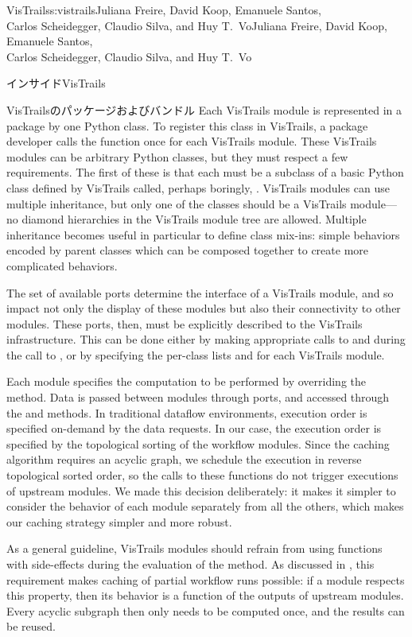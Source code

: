 \begin{aosachaptertoc}{VisTrails}{s:vistrails}{Juliana Freire, David Koop, Emanuele Santos, \\ Carlos Scheidegger, Claudio Silva, and Huy T.\ Vo}{Juliana Freire, David Koop, Emanuele Santos, \\ \hspace*{0.9cm} Carlos Scheidegger, Claudio Silva, and Huy T.\ Vo}
\begin{aosasect1}{インサイドVisTrails}
\begin{aosasect2}{VisTrailsのパッケージおよびバンドル}
Each VisTrails module is represented in a package by one Python
class. To register this class in VisTrails, a package developer calls
the  function once for each VisTrails module.  These
VisTrails modules can be arbitrary Python classes, but they must
respect a few requirements. The first of these is that each must be a
subclass of a basic Python class defined by VisTrails called, perhaps
boringly, .  VisTrails modules can use multiple
inheritance, but only one of the classes should be a VisTrails
module---no diamond hierarchies in the VisTrails module tree are
allowed. Multiple inheritance becomes useful in particular to define
class mix-ins: simple behaviors encoded by parent classes which can be
composed together to create more complicated behaviors.

The set of available ports determine the interface of a VisTrails
module, and so impact not only the display of these modules but also
their connectivity to other modules. These ports, then, must be
explicitly described to the VisTrails infrastructure. This can be done
either by making appropriate calls to  and
 during the call to , or by
specifying the per-class lists  and
 for each VisTrails module.

Each module specifies the computation to be performed by overriding
the  method. Data is passed between modules through
ports, and accessed through the  and
 methods.  In traditional dataflow environments,
execution order is specified on-demand by the data requests. In our
case, the execution order is specified by the topological sorting of the workflow
modules. Since the caching algorithm requires an acyclic graph, we
schedule the execution in reverse topological sorted order, so the
calls to these functions do not trigger executions of upstream
modules. We made this decision deliberately: it makes it simpler to
consider the behavior of each module separately from all the others,
which makes our caching strategy simpler and more robust.

As a general guideline, VisTrails modules should refrain from using
functions with side-effects during the evaluation of the
 method. As discussed in
, this requirement makes caching
of partial workflow runs possible: if a module respects this property,
then its behavior is a function of the outputs of upstream
modules. Every acyclic subgraph then only needs to be computed once,
and the results can be reused.


\end{aosasect2}
\end{aosasect1}
\end{aosachaptertoc}
